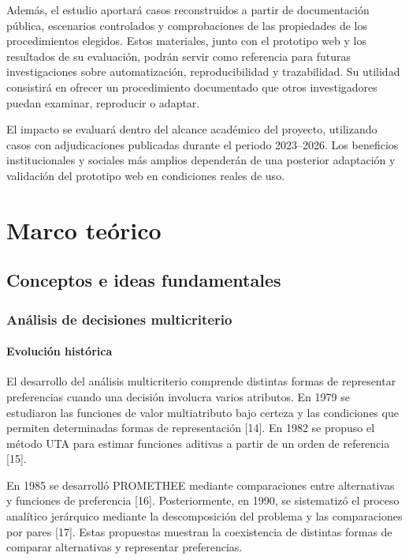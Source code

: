 \documentclass[12pt,a4paper]{article}
\begin{document}
Además, el estudio aportará casos reconstruidos a partir de documentación pública, escenarios controlados y comprobaciones de las propiedades de los procedimientos elegidos. Estos materiales, junto con el prototipo web y los resultados de su evaluación, podrán servir como referencia para futuras investigaciones sobre automatización, reproducibilidad y trazabilidad. Su utilidad consistirá en ofrecer un procedimiento documentado que otros investigadores puedan examinar, reproducir o adaptar.

El impacto se evaluará dentro del alcance académico del proyecto, utilizando casos con adjudicaciones publicadas durante el periodo 2023–2026. Los beneficios institucionales y sociales más amplios dependerán de una posterior adaptación y validación del prototipo web en condiciones reales de uso.

\section{Marco teórico}

\subsection{Conceptos e ideas fundamentales}

\subsubsection{Análisis de decisiones multicriterio}

\paragraph{Evolución histórica}

El desarrollo del análisis multicriterio comprende distintas formas de representar preferencias cuando una decisión involucra varios atributos. En 1979 se estudiaron las funciones de valor multiatributo bajo certeza y las condiciones que permiten determinadas formas de representación [14]. En 1982 se propuso el método UTA para estimar funciones aditivas a partir de un orden de referencia [15].

En 1985 se desarrolló PROMETHEE mediante comparaciones entre alternativas y funciones de preferencia [16]. Posteriormente, en 1990, se sistematizó el proceso analítico jerárquico mediante la descomposición del problema y las comparaciones por pares [17]. Estas propuestas muestran la coexistencia de distintas formas de comparar alternativas y representar preferencias.
\end{document}
